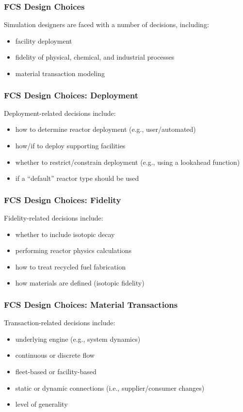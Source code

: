 \begin{frame}[ctb!]
  \frametitle{FCS Design Choices}
  Simulation designers are faced with a number of decisions, including:
  \begin{itemize}
    \item facility deployment
    \item fidelity of physical, chemical, and industrial processes
    \item material transaction modeling
  \end{itemize}
\end{frame}

\begin{frame}[ctb!]
  \frametitle{FCS Design Choices: Deployment}

  Deployment-related decisions include:
  \begin{itemize}
    \item how to determine reactor deployment (e.g., user/automated)
    \item how/if to deploy supporting facilities
    \item whether to restrict/constrain deployment (e.g., using a lookahead function)
    \item if a ``default'' reactor type should be used
  \end{itemize}

\end{frame}

\begin{frame}[ctb!]
  \frametitle{FCS Design Choices: Fidelity}

  Fidelity-related decisions include:
  \begin{itemize}
    \item whether to include isotopic decay
    \item performing reactor physics calculations
    \item how to treat recycled fuel fabrication
    \item how materials are defined (isotopic fidelity)
  \end{itemize}

\end{frame}

\begin{frame}[ctb!]
  \frametitle{FCS Design Choices: Material Transactions}

  Transaction-related decisions include:
  \begin{itemize}
    \item underlying engine (e.g., system dynamics)
    \item continuous or discrete flow
    \item fleet-based or facility-based
    \item static or dynamic connections (i.e., supplier/consumer changes)
    \item level of generality
  \end{itemize}

\end{frame}

